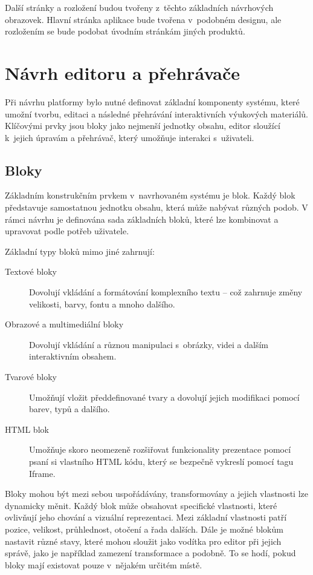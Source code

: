 Další stránky a rozložení budou tvořeny z~těchto základních návrhových obrazovek.
Hlavní stránka aplikace bude tvořena v~podobném designu, ale rozložením se bude podobat úvodním stránkám jiných produktů.

\section{Návrh editoru a přehrávače}\label{text:navrh/editor_player}

Při návrhu platformy bylo nutné definovat základní komponenty systému, které umožní tvorbu, editaci a následné přehrávání interaktivních výukových materiálů. 
Klíčovými prvky jsou bloky jako nejmenší jednotky obsahu, editor sloužící k~jejich úpravám a přehrávač, který umožňuje interakci s~uživateli.

\subsection{Bloky}

Základním konstrukčním prvkem v~navrhovaném systému je blok. 
Každý blok představuje samostatnou jednotku obsahu, která může nabývat různých podob. 
V rámci návrhu je definována sada základních bloků, které lze kombinovat a upravovat podle potřeb uživatele.

Základní typy bloků mimo jiné zahrnují:

\begin{description}
    \item[Textové bloky] Dovolují vkládání a formátování komplexního textu -- což zahrnuje změny velikosti, barvy, fontu a mnoho dalšího.
    \item[Obrazové a multimediální bloky] Dovolují vkládání a různou manipulaci s~obrázky, videi a dalším interaktivním obsahem.
    \item[Tvarové bloky] Umožňují vložit předdefinované tvary a dovolují jejich modifikaci pomocí barev, typů a dalšího.
    \item[HTML blok] Umožňuje skoro neomezeně rozšiřovat funkcionality prezentace pomocí psaní si vlastního HTML kódu, který se bezpečně vykreslí pomocí tagu Iframe.
\end{description}

Bloky mohou být mezi sebou uspořádávány, transformovány a jejich vlastnosti lze dynamicky měnit. 
Každý blok může obsahovat specifické vlastnosti, které ovlivňují jeho chování a vizuální reprezentaci.
Mezi základní vlastnosti patří pozice, velikost, průhlednost, otočení a řada dalších.
Dále je možné blokům nastavit různé stavy, které mohou sloužit jako vodítka pro editor při jejich správě, jako je například zamezení transformace a podobně.
To se hodí, pokud bloky mají existovat pouze v~nějakém určitém místě.

